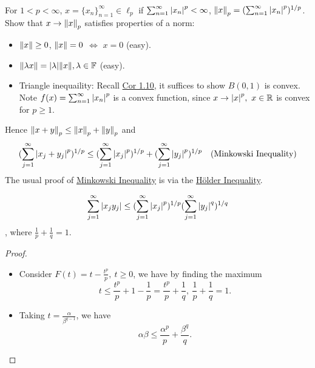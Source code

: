 \begin{remark}\ \\
    For $1 < p < \infty$, $x = \{x_n\}_{n = 1}^\infty \in \ell_p$ if $\sum_{n=1}^\infty \abs{x_n}^p < \infty$, $\norm{x}_p = (\sum_{n=1}^\infty \abs{x_n}^p)^{1/p}$.\\
    Show that $x \to \norm{x}_p$ satisfies properties of a norm:
    \begin{itemize}
        \item $\norm{x} \geq 0$, $\norm{x} = 0$ $\Leftrightarrow$ $x = 0$ (easy).
        \item $\norm{\lambda x} = \abs{\lambda} \norm{x}, \lambda \in \mathbb{F}$ (easy).
        \item Triangle inequaility: Recall \hyperref[1.10]{Cor 1.10}, it suffices to show $B(0,1)$ is convex. Note $f(x) = \sum_{n=1}^\infty \abs{x_n}^p$ is a convex function, since $x \to \abs{x}^p,\ x \in \mathbb{R}$ is convex for $p \geq 1$.
    \end{itemize}
    Hence $\norm{x + y}_p \leq \norm{x}_p + \norm{y}_p$ and
        \begin{equation*}
            (\sum_{j=1}^\infty \abs{x_j + y_j}^p)^{1/p} \leq (\sum_{j=1}^\infty \abs{x_j}^p)^{1/p} + (\sum_{j=1}^\infty \abs{y_j}^p)^{1/p} \quad (\text{Minkowski Inequality})
        \end{equation*}
    The usual proof of \underline{Minkowski Inequality} is via the \underline{H\"older Inequality}.
    \begin{lemma}
    \begin{equation*}
        \sum_{j = 1}^\infty \abs{x_j y_j} \leq (\sum_{j = 1}^\infty \abs{x_j}^p)^{1/p} (\sum_{j = 1}^\infty \abs{y_j}^q)^{1/q}
    \end{equation*}
, where $\frac{1}{p} + \frac{1}{q} = 1.$
    \end{lemma}
\begin{proof}
\begin{itemize}
    \item Consider $F(t) = t - \frac{t^p}{p},\ t \geq 0$, we have by finding the maximum
    \begin{equation*}
        t \leq \frac{t^p}{p} + 1 - \frac{1}{p} = \frac{t^p}{p} + \frac{1}{q},\ \frac{1}{p} + \frac{1}{q} = 1.
    \end{equation*}
    \item Taking $t = \frac{\alpha}{\beta^{q - 1}}$, we have
    \begin{equation*}
        \alpha \beta \leq \frac{\alpha^p}{p} + \frac{\beta^q}{q}.

\end{equation*}
\end{itemize}
\end{proof}
\end{remark}
